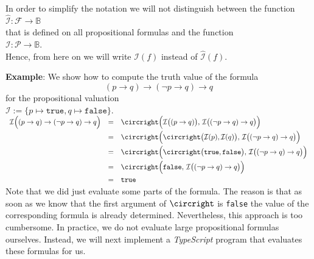 In order to simplify the notation we will not distinguish between the function
\\[0.2cm]
\hspace*{1.3cm}
$\widehat{\mathcal{I}}: \mathcal{F} \rightarrow \mathbb{B}$
\\[0.2cm]
that is defined on all propositional formulas and the function
\\[0.2cm]
\hspace*{1.3cm}
$\mathcal{I}: \mathcal{P} \rightarrow \mathbb{B}$.
\\[0.2cm]
Hence, from here on we will write $\mathcal{I}(f)$ instead of $\widehat{\mathcal{I}}(f)$.

\noindent
\textbf{Example}: We show how to compute the truth value of the formula
$$  (p \rightarrow q) \rightarrow (\neg p \rightarrow q) \rightarrow q $$
for the propositional valuation
\\[0.2cm]
\hspace*{1.3cm}
$\mathcal{I} := \{ p \mapsto \mathtt{true}, q \mapsto \mathtt{false} \}$.
\\[0.2cm]
\hspace*{1.3cm}
$
  \begin{array}[b]{lcl}
   \mathcal{I}\Bigl( (p \rightarrow q) \rightarrow (\neg p \rightarrow q) \rightarrow q  \Bigr) 
   & = &  \circright\Bigl( \mathcal{I}\bigl( (p \rightarrow q) \bigr),\, \mathcal{I}\bigl((\neg p \rightarrow q) \rightarrow q\bigr) \Bigr) \\[0.2cm]
   & = & \circright\Bigl( \circright\bigl( \mathcal{I}(p), \mathcal{I}(q) \bigr),\, \mathcal{I}\bigl((\neg p \rightarrow q) \rightarrow q\bigr) \Bigr) \\[0.2cm]
   & = & \circright\Bigl( \circright\bigl( \texttt{true}, \texttt{false} \bigr),\, \mathcal{I}\bigl((\neg p \rightarrow q) \rightarrow q\bigr) \Bigr) \\[0.2cm]
   & = & \circright\Bigl( \texttt{false}, \, \mathcal{I}\bigl((\neg p \rightarrow q) \rightarrow q\bigr) \Bigr) \\[0.2cm]
   & = & \texttt{true} 
  \end{array}
$ \eox
\\[0.2cm]
Note that we did just evaluate some parts of the formula.  The reason is that as soon as we know that the first
argument of $\circright$ is \texttt{false} the value of the corresponding formula is already determined.
Nevertheless, this approach is too cumbersome.  In practice, we do not evaluate large propositional formulas
ourselves.  Instead, we will next implement a \textsl{TypeScript} program that evaluates these formulas for us.

